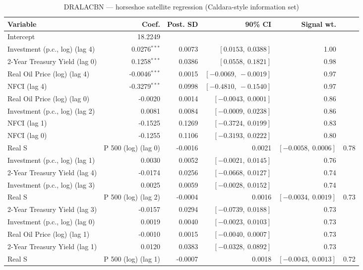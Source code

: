\begin{table}[!htbp]
\centering
\caption{DRALACBN --- horseshoe satellite regression (Caldara-style information set)}
\label{tab:dralacbn_caldara_style_horseshoe}
\begin{tabular}{lrrrr}
\toprule
Variable & Coef. & Post. SD & 90\% CI & Signal wt. \\
\midrule
Intercept & 18.2249 & & & \\
Investment (p.c., log) (lag 4) & 0.0276$^{***}$ & 0.0073 & $[0.0153,\ 0.0388]$ & 1.00 \\
2-Year Treasury Yield (lag 0) & 0.1258$^{***}$ & 0.0386 & $[0.0558,\ 0.1821]$ & 0.98 \\
Real Oil Price (log) (lag 4) & -0.0046$^{***}$ & 0.0015 & $[-0.0069,\ -0.0019]$ & 0.97 \\
NFCI (lag 4) & -0.3279$^{***}$ & 0.0998 & $[-0.4810,\ -0.1540]$ & 0.97 \\
Real Oil Price (log) (lag 0) & -0.0020 & 0.0014 & $[-0.0043,\ 0.0001]$ & 0.86 \\
Investment (p.c., log) (lag 2) & 0.0081 & 0.0084 & $[-0.0009,\ 0.0238]$ & 0.86 \\
NFCI (lag 1) & -0.1525 & 0.1269 & $[-0.3724,\ 0.0199]$ & 0.83 \\
NFCI (lag 0) & -0.1255 & 0.1106 & $[-0.3193,\ 0.0222]$ & 0.80 \\
Real S&P 500 (log) (lag 0) & -0.0016 & 0.0021 & $[-0.0058,\ 0.0006]$ & 0.78 \\
Investment (p.c., log) (lag 1) & 0.0030 & 0.0052 & $[-0.0021,\ 0.0145]$ & 0.76 \\
2-Year Treasury Yield (lag 4) & -0.0174 & 0.0256 & $[-0.0668,\ 0.0127]$ & 0.74 \\
Investment (p.c., log) (lag 3) & 0.0025 & 0.0059 & $[-0.0028,\ 0.0152]$ & 0.74 \\
Real S&P 500 (log) (lag 2) & -0.0004 & 0.0016 & $[-0.0034,\ 0.0019]$ & 0.73 \\
2-Year Treasury Yield (lag 3) & -0.0157 & 0.0294 & $[-0.0739,\ 0.0188]$ & 0.73 \\
Investment (p.c., log) (lag 0) & 0.0019 & 0.0040 & $[-0.0023,\ 0.0103]$ & 0.73 \\
Real Oil Price (log) (lag 1) & -0.0010 & 0.0015 & $[-0.0040,\ 0.0007]$ & 0.73 \\
2-Year Treasury Yield (lag 1) & 0.0120 & 0.0383 & $[-0.0328,\ 0.0892]$ & 0.73 \\
Real S&P 500 (log) (lag 1) & -0.0007 & 0.0018 & $[-0.0043,\ 0.0013]$ & 0.72 \\

\end{tabular}
\end{table}
